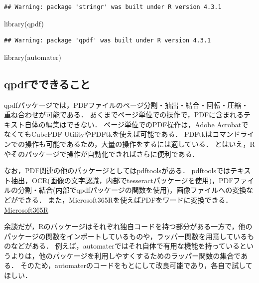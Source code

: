 \documentclass[
]{article}
\newenvironment{Shaded}{\begin{snugshade}}{\end{snugshade}}
\newcommand{\FunctionTok}[1]{\textcolor[rgb]{0.00,0.00,0.00}{#1}}
\newcommand{\NormalTok}[1]{#1}
\begin{document}
\begin{verbatim}
## Warning: package 'stringr' was built under R version 4.3.1
\end{verbatim}

\begin{Shaded}
\begin{Highlighting}[]
\FunctionTok{library}\NormalTok{(qpdf)}
\end{Highlighting}
\end{Shaded}

\begin{verbatim}
## Warning: package 'qpdf' was built under R version 4.3.1
\end{verbatim}

\begin{Shaded}
\begin{Highlighting}[]
\FunctionTok{library}\NormalTok{(automater)}
\end{Highlighting}
\end{Shaded}

\hypertarget{qpdfux3067ux3067ux304dux308bux3053ux3068}{%
\subsection{qpdfでできること}\label{qpdfux3067ux3067ux304dux308bux3053ux3068}}

qpdfパッケージでは，PDFファイルのページ分割・抽出・結合・回転・圧縮・重ね合わせが可能である．
あくまでページ単位での操作で，PDFに含まれるテキスト自体の編集はできない．
ページ単位でのPDF操作は，Adobe AcrobatでなくてもCubePDF UtilityやPDFtkを使えば可能である．
PDFtkはコマンドラインでの操作も可能であるため，大量の操作をするには適している．
とはいえ，Rやそのパッケージで操作が自動化できればさらに便利である．

なお，PDF関連の他のパッケージとしてはpdftoolsがある．
pdftoolsではテキスト抽出，OCR(画像の文字認識，内部でtesseractパッケージを使用)，PDFファイルの分割・結合(内部でqpdfパッケージの関数を使用)，画像ファイルへの変換などができる．
また，Microsoft365Rを使えばPDFをワードに変換できる．
\protect\hyperlink{microsoft365r}{Microsoft365R}

余談だが，Rのパッケージはそれぞれ独自コードを持つ部分がある一方で，他のパッケージの関数をインポートしているものや，ラッパー関数を用意しているものなどがある．
例えば，automaterではそれ自体で有用な機能を持っているというよりは，他のパッケージを利用しやすくするためのラッパー関数の集合である．
そのため，automaterのコードをもとにして改良可能であり，各自で試してほしい．
\end{document}
